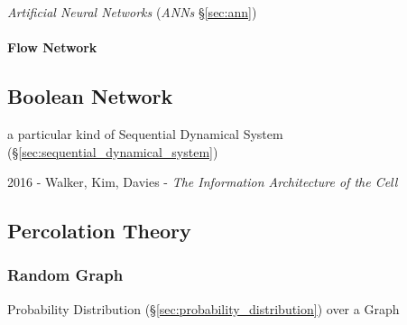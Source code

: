 \fist \emph{Artificial Neural Networks} (\emph{ANNs} \S\ref{sec:ann})



\paragraph{Flow Network}\label{sec:flow_network}\hfill



\subsection{Boolean Network}\label{sec:boolean_network}


a particular kind of Sequential Dynamical System
(\S\ref{sec:sequential_dynamical_system})

2016 - Walker, Kim, Davies - \emph{The Information Architecture of the Cell}



\subsection{Percolation Theory}\label{sec:percolation_theory}

\subsubsection{Random Graph}\label{sec:random_graph}

Probability Distribution (\S\ref{sec:probability_distribution}) over a Graph
